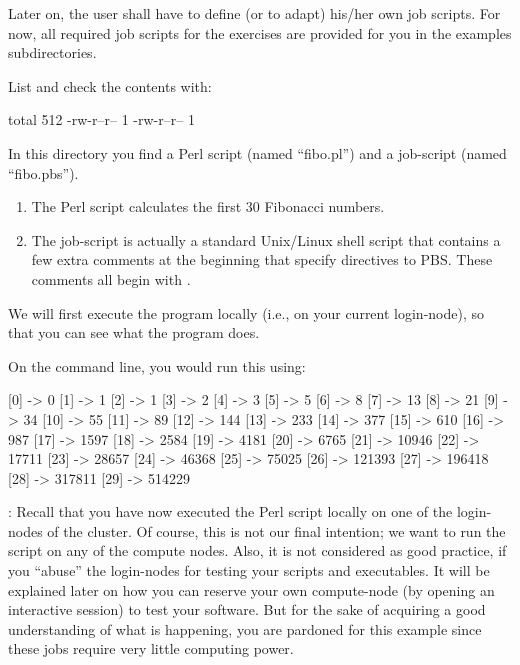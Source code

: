 Later on, the \hpc user shall have to define (or to adapt) his/her own
job scripts. For now, all required job scripts for the
exercises are provided for you in the examples subdirectories.

List and check the contents with:

\begin{prompt}
total 512
-rw-r--r-- 1 %
-rw-r--r-- 1 %
\end{prompt}

In this directory you find a Perl script (named ``fibo.pl'') and a job-script
(named ``fibo.pbs'').

\begin{enumerate}
\item  The Perl script calculates the first 30 Fibonacci numbers.
\item  The job-script is actually a standard Unix/Linux shell script that
  contains a few extra comments at the beginning that specify directives to
  PBS.  These comments all begin with .
\end{enumerate}

We will first execute the program locally (i.e., on your current login-node),
so that you can see what the program does.

On the command line, you would run this using:

\begin{prompt}
[0] -> 0
[1] -> 1
[2] -> 1
[3] -> 2
[4] -> 3
[5] -> 5
[6] -> 8
[7] -> 13
[8] -> 21
[9] -> 34
[10] -> 55
[11] -> 89
[12] -> 144
[13] -> 233
[14] -> 377
[15] -> 610
[16] -> 987
[17] -> 1597
[18] -> 2584
[19] -> 4181
[20] -> 6765
[21] -> 10946
[22] -> 17711
[23] -> 28657
[24] -> 46368
[25] -> 75025
[26] -> 121393
[27] -> 196418
[28] -> 317811
[29] -> 514229
\end{prompt}

: Recall that you have now executed the Perl script locally on
one of the login-nodes of the \hpc cluster.  Of course, this is not our final
intention; we want to run the script on any of the compute nodes. Also, it is
not considered as good practice, if you ``abuse'' the login-nodes for testing
your scripts and executables. It will be explained later on how you can
reserve your own compute-node (by opening an interactive session) to test
your software. But for the sake of acquiring a good understanding of what is
happening, you are pardoned for this example since these jobs require very little
computing power.

